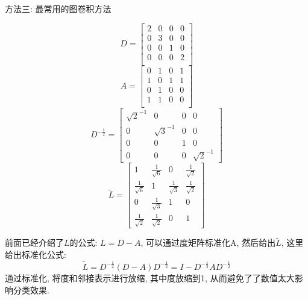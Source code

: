 \documentclass{beamer}
\begin{document}
\begin{frame}{方法三: 最常用的图卷积方法}\footnotesize
    \begin{multicols}{2}
        \[
            D =
            \begin{bmatrix}
                2 & 0 & 0 & 0 \\
                0 & 3 & 0 & 0 \\
                0 & 0 & 1 & 0 \\
                0 & 0 & 0 & 2 \\
            \end{bmatrix}
        \]
        \[
            A =
            \begin{bmatrix}
                0 & 1 & 0 & 1 \\
                1 & 0 & 1 & 1 \\
                0 & 1 & 0 & 0 \\
                1 & 1 & 0 & 0 \\
            \end{bmatrix}
        \]
        \[
            D^{-\frac{1}{2}} =
            \begin{bmatrix}
                \sqrt{2}^{-1} & 0             & 0 & 0             \\
                0             & \sqrt{3}^{-1} & 0 & 0             \\
                0             & 0             & 1 & 0             \\
                0             & 0             & 0 & \sqrt{2}^{-1}
            \end{bmatrix}
        \]
        \[
            \tilde{L} = \begin{bmatrix}
                1                  & \frac{1}{\sqrt{6}} & 0                  & \frac{1}{\sqrt{2}} \\
                \frac{1}{\sqrt{6}} & 1                  & \frac{1}{\sqrt{3}} & \frac{1}{\sqrt{2}} \\
                0                  & \frac{1}{\sqrt{3}} & 1                  & 0                  \\
                \frac{1}{\sqrt{2}} & \frac{1}{\sqrt{2}} & 0                  & 1
            \end{bmatrix}
        \]

    \end{multicols}
    前面已经介绍了$L$的公式: $L=D-A$, 可以通过度矩阵标准化A, 然后给出$\tilde{L}$, 这里给出标准化公式:
    $$ \tilde{L} = D^{-\frac{1}{2}}(D-A)D^{-\frac{1}{2}} = I - D^{-\frac{1}{2}}AD^{-\frac{1}{2}} $$
    通过标准化, 将度和邻接表示进行放缩, 其中度放缩到1, 从而避免了了数值太大影响分类效果.\\
\end{frame}
\end{document}
